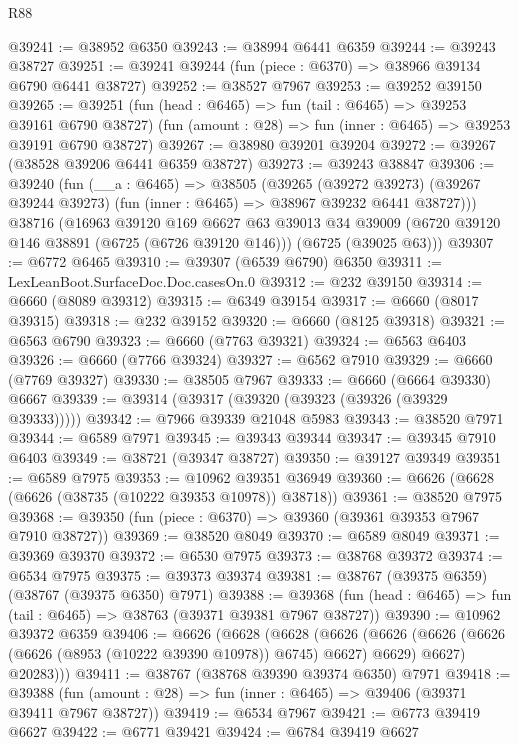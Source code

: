 \begin{lexlean}{R88}
\begin{coremodule}
@39241 := @38952 @6350
@39243 := @38994 @6441 @6359
@39244 := @39243 @38727
@39251 := @39241 @39244 (fun (piece : @6370) => @38966 @39134 @6790 @6441 @38727)
@39252 := @38527 @7967
@39253 := @39252 @39150
@39265 := @39251
    (fun (head : @6465) => fun (tail : @6465) => @39253 @39161 @6790 @38727)
    (fun (amount : @28) => fun (inner : @6465) => @39253 @39191 @6790 @38727)
@39267 := @38980 @39201 @39204
@39272 := @39267 (@38528 @39206 @6441 @6359 @38727)
@39273 := @39243 @38847
@39306 := @39240
    (fun (__a : @6465) =>
    @38505
      (@39265
        (@39272 @39273)
        (@39267 @39244 @39273)
        (fun (inner : @6465) => @38967 @39232 @6441 @38727)))
    @38716
    (@16963
      @39120
      @169
      @6627
      @63
      @39013
      @34
      @39009
      (@6720 @39120 @146 @38891 (@6725 (@6726 @39120 @146)))
      (@6725 (@39025 @63)))
@39307 := @6772 @6465
@39310 := @39307 (@6539 @6790) @6350
@39311 := LexLeanBoot.SurfaceDoc.Doc.casesOn.{0}
@39312 := @232 @39150
@39314 := @6660 (@8089 @39312)
@39315 := @6349 @39154
@39317 := @6660 (@8017 @39315)
@39318 := @232 @39152
@39320 := @6660 (@8125 @39318)
@39321 := @6563 @6790
@39323 := @6660 (@7763 @39321)
@39324 := @6563 @6403
@39326 := @6660 (@7766 @39324)
@39327 := @6562 @7910
@39329 := @6660 (@7769 @39327)
@39330 := @38505 @7967
@39333 := @6660 (@6664 @39330) @6667
@39339 := @39314 (@39317 (@39320 (@39323 (@39326 (@39329 @39333)))))
@39342 := @7966 @39339 @21048 @5983
@39343 := @38520 @7971
@39344 := @6589 @7971
@39345 := @39343 @39344
@39347 := @39345 @7910 @6403
@39349 := @38721 (@39347 @38727)
@39350 := @39127 @39349
@39351 := @6589 @7975
@39353 := @10962 @39351 @36949
@39360 := @6626 (@6628 (@6626 (@38735 (@10222 @39353 @10978)) @38718))
@39361 := @38520 @7975
@39368 := @39350 (fun (piece : @6370) => @39360 (@39361 @39353 @7967 @7910 @38727))
@39369 := @38520 @8049
@39370 := @6589 @8049
@39371 := @39369 @39370
@39372 := @6530 @7975
@39373 := @38768 @39372
@39374 := @6534 @7975
@39375 := @39373 @39374
@39381 := @38767 (@39375 @6359) (@38767 (@39375 @6350) @7971)
@39388 := @39368 (fun (head : @6465) => fun (tail : @6465) => @38763 (@39371 @39381 @7967 @38727))
@39390 := @10962 @39372 @6359
@39406 := @6626
    (@6628
      (@6628
        (@6626
          (@6626 (@6626 (@6626 (@6626 (@8953 (@10222 @39390 @10978)) @6745) @6627) @6629) @6627)
          @20283)))
@39411 := @38767 (@38768 @39390 @39374 @6350) @7971
@39418 := @39388 (fun (amount : @28) => fun (inner : @6465) => @39406 (@39371 @39411 @7967 @38727))
@39419 := @6534 @7967
@39421 := @6773 @39419 @6627
@39422 := @6771 @39421
@39424 := @6784 @39419 @6627

\end{coremodule}
\end{lexlean}
